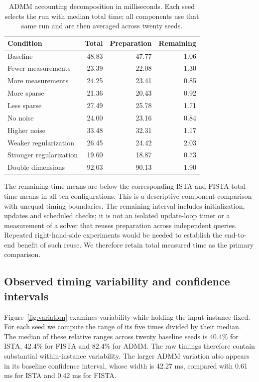 \documentclass{article}
\begin{document}
\begin{table}[htbp]\centering\small
\caption{ADMM accounting decomposition in milliseconds. Each seed selects the run with median total time; all components use that same run and are then averaged across twenty seeds.}
\begin{tabular}{lrrr}\toprule
Condition & Total & Preparation & Remaining \\\midrule
Baseline & 48.83 & 47.77 & 1.06 \\
Fewer measurements & 23.39 & 22.08 & 1.30 \\
More measurements & 24.25 & 23.41 & 0.85 \\
More sparse & 21.36 & 20.43 & 0.92 \\
Less sparse & 27.49 & 25.78 & 1.71 \\
No noise & 24.00 & 23.16 & 0.84 \\
Higher noise & 33.48 & 32.31 & 1.17 \\
Weaker regularization & 26.45 & 24.42 & 2.03 \\
Stronger regularization & 19.60 & 18.87 & 0.73 \\
Double dimensions & 92.03 & 90.13 & 1.90 \\
\bottomrule\end{tabular}\end{table}
The remaining-time means are below the corresponding ISTA and FISTA total-time means in all ten configurations. This is a descriptive component comparison with unequal timing boundaries. The remaining interval includes initialization, updates and scheduled checks; it is not an isolated update-loop timer or a measurement of a solver that reuses preparation across independent queries. Repeated right-hand-side experiments would be needed to establish the end-to-end benefit of such reuse. We therefore retain total measured time as the primary comparison.

\subsection{Observed timing variability and confidence intervals}
Figure~\ref{fig:variation} examines variability while holding the input instance fixed. For each seed we compute the range of its five times divided by their median. The median of these relative ranges across twenty baseline seeds is 40.4\% for ISTA, 42.4\% for FISTA and 82.4\% for ADMM. The raw timings therefore contain substantial within-instance variability. The larger ADMM variation also appears in its baseline confidence interval, whose width is 42.27 ms, compared with 0.61 ms for ISTA and 0.42 ms for FISTA.
\end{document}
